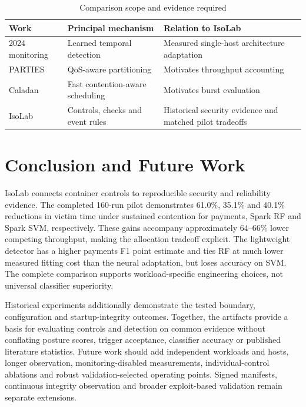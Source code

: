 \documentclass[conference,letterpaper]{IEEEtran}
\begin{document}
\begin{table}[t]
\caption{Comparison scope and evidence required}
\label{tab:comparison_scope}
\centering\small
\begin{tabular}{p{}p{}p{}}
\toprule
Work & Principal mechanism & Relation to IsoLab \\
\midrule
2024 monitoring & Learned temporal detection & Measured single-host architecture adaptation \\
PARTIES & QoS-aware partitioning & Motivates throughput accounting \\
Caladan & Fast contention-aware scheduling & Motivates burst evaluation \\
IsoLab & Controls, checks and event rules & Historical security evidence and matched pilot tradeoffs \\
\bottomrule
\end{tabular}
\end{table}



\balance
\section{Conclusion and Future Work}
IsoLab connects container controls to reproducible security and reliability evidence.
The completed 160-run pilot demonstrates 61.0\%, 35.1\% and 40.1\% reductions in
victim time under sustained contention for payments, Spark RF and Spark SVM,
respectively. These gains accompany approximately 64--66\% lower competing
throughput, making the allocation tradeoff explicit. The lightweight detector
has a higher payments F1 point estimate and ties RF at much lower measured fitting
cost than the neural adaptation, but loses accuracy on SVM. The complete comparison
supports workload-specific engineering choices, not universal classifier superiority.

Historical experiments additionally demonstrate the tested boundary, configuration
and startup-integrity outcomes. Together, the artifacts provide a basis for evaluating
controls and detection on common evidence without conflating posture scores,
trigger acceptance, classifier accuracy or published literature statistics.
Future work should add independent workloads and hosts, longer observation,
monitoring-disabled measurements, individual-control ablations and robust
validation-selected operating points. Signed manifests, continuous integrity
observation and broader exploit-based validation remain separate extensions.
\end{document}
